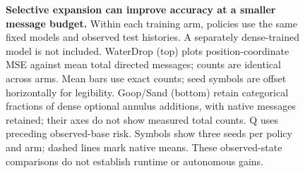 \begin{figure}[t]
\caption{\textbf{Selective expansion can improve accuracy at a smaller message budget.} Within each training arm, policies use the same fixed models and observed test histories. A separately dense-trained model is not included. WaterDrop (top) plots position-coordinate MSE against mean total directed messages; counts are identical across arms. Mean bars use exact counts; seed symbols are offset horizontally for legibility. Goop/Sand (bottom) retain categorical fractions of dense optional annulus additions, with native messages retained; their axes do not show measured total counts. Q uses preceding observed-base risk. Symbols show three seeds per policy and arm; dashed lines mark native means. These observed-state comparisons do not establish runtime or autonomous gains.}
\label{fig:observed-accuracy-budget}
\end{figure}
